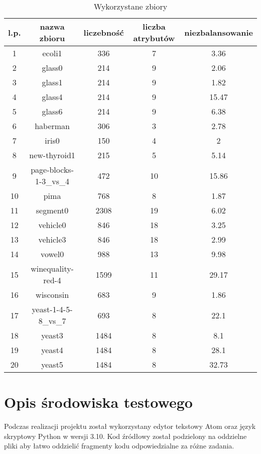 \documentclass[a4paper,12pt]{article}
\begin{document}
\begin{table}[h]
    \begin{center}
    \caption{Wykorzystane zbiory}
    \label{tab:sets}
    \begin{tabular}{|c|c|c|c|c|}
    \hline
    l.p. & nazwa zbioru & liczebność & liczba atrybutów & niezbalansowanie \\
    \hline
    \hline
    1 & ecoli1 & 336 & 7 & 3.36 \\
    \hline
    2 & glass0 & 214 & 9 & 2.06 \\
    \hline
    3 & glass1 & 214 & 9 & 1.82 \\
    \hline
    4 & glass4 & 214 & 9 & 15.47 \\
    \hline
    5 & glass6 & 214 & 9 & 6.38 \\
    \hline
    6 & haberman & 306 & 3 & 2.78 \\
    \hline
    7 & iris0  & 150 & 4 & 2 \\
    \hline
    8 & new-thyroid1 & 215 & 5 & 5.14 \\
    \hline
    9 & page-blocks-1-3\_vs\_4 & 472 & 10 & 15.86 \\
    \hline
    10 & pima & 768 & 8 & 1.87 \\
    \hline
    11 & segment0 & 2308 & 19 & 6.02 \\
    \hline
    12 & vehicle0 & 846 & 18 & 3.25 \\
    \hline
    13 & vehicle3 & 846 & 18 & 2.99 \\
    \hline
    14 & vowel0 & 988 & 13 & 9.98 \\
    \hline
    15 & winequality-red-4 & 1599 & 11 & 29.17 \\
    \hline
    16 & wisconsin & 683 & 9 & 1.86 \\
    \hline
    17 & yeast-1-4-5-8\_vs\_7 & 693 & 8 & 22.1 \\
    \hline
    18 & yeast3 & 1484 & 8 & 8.1 \\
    \hline
    19 & yeast4 & 1484 & 8 & 28.1 \\
    \hline
    20 & yeast5 & 1484 & 8 & 32.73 \\
    \hline
    \end{tabular}
    \end{center}
\end{table}

\newpage
\section{Opis środowiska testowego}
Podczas realizacji projektu został wykorzystany edytor tekstowy Atom\cite{atom} oraz język skryptowy Python\cite{python3} w wersji 3.10.  Kod źródłowy został podzielony na oddzielne pliki aby łatwo oddzielić fragmenty kodu odpowiedzialne za różne zadania.
\end{document}
